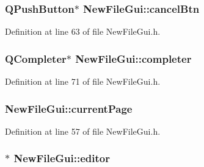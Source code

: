 \hypertarget{class_new_file_gui_a5be4525cfa97c2ec799a7357eb6a1fb4}{
\subsubsection[{cancel\-Btn}]{\setlength{\rightskip}{0pt plus 5cm}Q\-Push\-Button$\ast$ New\-File\-Gui\-::cancel\-Btn\hspace{0.3cm}{\ttfamily [private]}}}\label{class_new_file_gui_a5be4525cfa97c2ec799a7357eb6a1fb4}


Definition at line 63 of file New\-File\-Gui.\-h.

\hypertarget{class_new_file_gui_a5c8508fb9dba194838e0cfce4d6f7988}{
\subsubsection[{completer}]{\setlength{\rightskip}{0pt plus 5cm}Q\-Completer$\ast$ New\-File\-Gui\-::completer\hspace{0.3cm}{\ttfamily [private]}}}\label{class_new_file_gui_a5c8508fb9dba194838e0cfce4d6f7988}


Definition at line 71 of file New\-File\-Gui.\-h.

\hypertarget{class_new_file_gui_adaf414f47f140c24e8f08797262c646b}{
\subsubsection[{current\-Page}]{ New\-File\-Gui\-::current\-Page\hspace{0.3cm}{\ttfamily [private]}}}\label{class_new_file_gui_adaf414f47f140c24e8f08797262c646b}


Definition at line 57 of file New\-File\-Gui.\-h.

\hypertarget{class_new_file_gui_a7521ff2d2934c4a19fbef21a3a034ee9}{
\subsubsection[{editor}]{$\ast$ New\-File\-Gui\-::editor\hspace{0.3cm}{\ttfamily [private]}}}\label{class_new_file_gui_a7521ff2d2934c4a19fbef21a3a034ee9}


